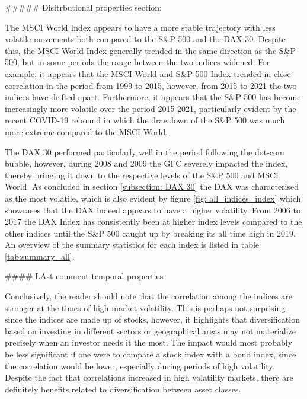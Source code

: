 ##### Disitrbutional properties section:

The MSCI World Index appears to have a more stable trajectory with less volatile movements both compared to the S\&P 500 and the DAX 30. Despite this, the MSCI World Index generally trended in the same direction as the S\&P 500,
but in some periods the range between the two indices widened. For example,
it appears that the MSCI World and S\&P 500 Index trended in close correlation in the period from 1999 to 2015, however, from 2015 to 2021 the two indices have drifted apart. Furthermore, it appears that the S\&P 500 has become increasingly more volatile over the period 2015-2021, particularly evident by the recent COVID-19 rebound in which the drawdown of the S\&P 500 was much more extreme compared to the MSCI World.  

The DAX 30 performed particularly well in the period following the dot-com bubble, however, during 2008 and 2009 the GFC severely impacted the index, thereby bringing it down to the respective levels of the S\&P 500 and MSCI World. As concluded in section \ref{subsection: DAX 30} the DAX was characterised as the most volatile, which is also evident by figure \ref{fig: all_indices_index} which showcases that the DAX indeed appears to have a higher volatility. From 2006 to 2017 the DAX Index has consistently been at higher index levels compared to the other indices until the S\&P 500 caught up by breaking its all time high in 2019. An overview of the summary statistics for each index is listed in table \ref{tab:summary_all}.

#### LAst comment temporal properties

Conclusively, the reader should note that the correlation among the indices are stronger at the times of high market volatility. This is perhaps not surprising since the indices are made up of stocks, however, it highlights that diversification based on investing in different sectors or geographical areas may not materialize precisely when an investor needs it the most. The impact would most probably be less significant if one were to compare a stock index with a bond index, since the correlation would be lower, especially during periods of high volatility. Despite the fact that correlations increased in high volatility markets, there are definitely benefits related to diversification between asset classes.